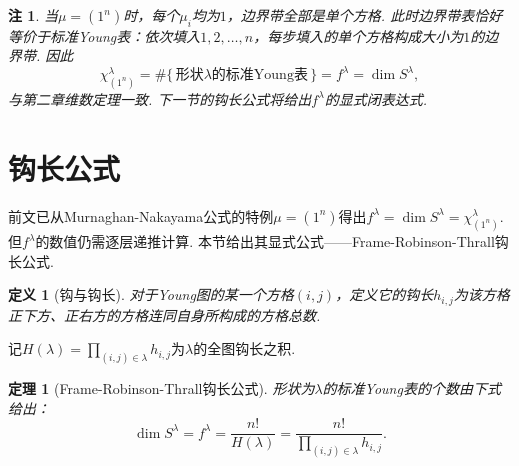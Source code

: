 \documentclass{sjtureport}
\newtheorem{theorem}{定理}[chapter]
\newtheorem{definition}{定义}[chapter]
\newtheorem{remark}{注}[chapter]
\begin{document}
\begin{remark}\label{rem:MN-to-hook}
    当$\mu=(1^n)$时，每个$\mu_i$均为$1$，边界带全部是单个方格. 此时边界带表恰好等价于标准Young表：依次填入$1,2,\dots,n$，每步填入的单个方格构成大小为$1$的边界带. 因此
    \begin{equation*}
        \chi^\lambda_{(1^n)} = \#\{\,\text{形状}\lambda\text{的标准Young表}\,\} = f^\lambda = \dim S^\lambda,
    \end{equation*}
    与第二章维数定理一致. 下一节的钩长公式将给出$f^\lambda$的显式闭表达式. 
\end{remark}


\section{钩长公式}

前文已从Murnaghan-Nakayama公式的特例$\mu=(1^n)$得出$f^\lambda=\dim S^\lambda=\chi^\lambda_{(1^n)}$. 但$f^\lambda$的数值仍需逐层递推计算. 本节给出其显式公式——Frame-Robinson-Thrall钩长公式.

\begin{definition}[钩与钩长]
    对于Young图的某一个方格$(i, j)$，定义它的钩长$h_{i,j}$为该方格正下方、正右方的方格连同自身所构成的方格总数.
\end{definition}

记$H(\lambda)=\prod_{(i,j)\in\lambda} h_{i,j}$为$\lambda$的全图钩长之积. 

\begin{theorem}[Frame-Robinson-Thrall钩长公式]\label{thm:hook}
    形状为$\lambda$的标准Young表的个数由下式给出：
    \begin{equation}\label{eq:hook}
        \dim S^\lambda = f^\lambda = \frac{n!}{H(\lambda)} = \frac{n!}{\prod_{(i,j) \in \lambda} h_{i,j}}.
    \end{equation}
\end{theorem}
\end{document}
